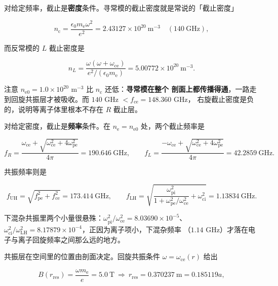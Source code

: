 对给定频率，截止是\textbf{密度}条件。寻常模的截止密度就是常说的「截止密度」

\begin{equation}
n_\mathrm{c}=\frac{\epsilon_0m_\mathrm{e}\omega^2}{e^2}=2.43127\times10^{20}\ \mathrm{m^{-3}}
\quad (140\ \mathrm{GHz}),
\label{eq:app-at-ncut}
\end{equation}

而反常模的 $L$ 截止密度是

\begin{equation}
n_L=\frac{\omega(\omega+\omega_\mathrm{ce})}{e^2/(\epsilon_0m_\mathrm{e})}
=5.00772\times10^{20}\ \mathrm{m^{-3}} .
\label{eq:app-at-nL}
\end{equation}

注意 $n_\mathrm{e0}=1.0\times10^{20}$ m$^{-3}$ 比 $n_\mathrm{c}$ 还低：\textbf{寻常模在整个
剖面上都传播得通}，一路走到回旋共振层才被吸收。而 $140$ GHz $<f_\mathrm{ce}=148.360$ GHz，
右旋截止密度是负的，说明等离子体里根本不存在 $R$ 截止层。

对给定密度，截止是\textbf{频率}条件。在 $n_\mathrm{e}=n_\mathrm{e0}$ 处，两个截止频率是

\begin{equation}
f_R=\frac{\omega_\mathrm{ce}+\sqrt{\omega_\mathrm{ce}^2+4\omega_\mathrm{pe}^2}}{4\pi}
=190.646\ \mathrm{GHz},\qquad
f_L=\frac{-\omega_\mathrm{ce}+\sqrt{\omega_\mathrm{ce}^2+4\omega_\mathrm{pe}^2}}{4\pi}
=42.2859\ \mathrm{GHz} .
\label{eq:app-at-fr}
\end{equation}

共振频率则是

\begin{equation}
f_\mathrm{UH}=\sqrt{f_\mathrm{pe}^2+f_\mathrm{ce}^2}=173.414\ \mathrm{GHz},\qquad
f_\mathrm{LH}=\sqrt{\frac{\omega_\mathrm{pi}^2}{1+\omega_\mathrm{pe}^2/\omega_\mathrm{ce}^2}
+\omega_\mathrm{ci}^2}=1.13834\ \mathrm{GHz}.
\label{eq:app-at-uh}
\end{equation}

下混杂共振里两个小量很悬殊：$\omega_\mathrm{pi}^2/\omega_\mathrm{ce}^2=8.03690\times10^{-5}$、
$\omega_\mathrm{ci}^2/\omega_\mathrm{LH}^2=8.17879\times10^{-4}$，正因为离子项小，下混杂频率
（$1.14$ GHz）才落在电子与离子回旋频率之间那么远的地方。

共振层在空间里的位置由剖面决定。回旋共振条件 $\omega=\omega_\mathrm{ce}(r)$ 给出

\begin{equation}
B(r_\mathrm{res})=\frac{\omega m_\mathrm{e}}{e}=5.0\ \mathrm{T}
\ \Longrightarrow\ r_\mathrm{res}=0.370237\ \mathrm{m}=0.185119a ,
\label{eq:app-at-ecres}
\end{equation}

